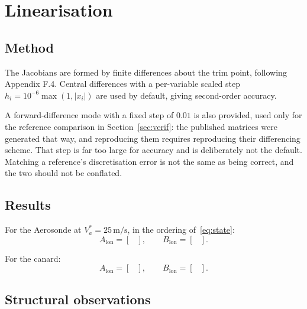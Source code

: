 \documentclass[11pt,a4paper]{article}
\newcommand{\lon}{\mathrm{lon}}
\begin{document}
\section{Linearisation}\label{sec:lin}

\subsection{Method}

The Jacobians are formed by finite differences about the trim point, following
Appendix F.4. Central differences with a per-variable scaled step
$h_i = 10^{-6}\max(1,|x_i|)$ are used by default, giving second-order accuracy.

A forward-difference mode with a fixed step of $0.01$ is also provided, used
only for the reference comparison in Section~\ref{sec:verif}: the published
matrices were generated that way, and reproducing them requires reproducing their
differencing scheme. That step is far too large for accuracy and is deliberately
not the default. Matching a reference's discretisation error is not the same as
being correct, and the two should not be conflated.

\subsection{Results}

For the Aerosonde at $V_a^*=25\,\mathrm{m/s}$, in the ordering
of~\eqref{eq:state}:
\begin{equation}
  A_\lon = \begin{bmatrix}
    
  \end{bmatrix},
  \qquad
  B_\lon = \begin{bmatrix}
    
  \end{bmatrix}.
  \label{eq:Aaero}
\end{equation}

For the canard:
\begin{equation}
  A_\lon = \begin{bmatrix}
    
  \end{bmatrix},
  \qquad
  B_\lon = \begin{bmatrix}
    
  \end{bmatrix}.
  \label{eq:Acanard}
\end{equation}

\subsection{Structural observations}
\end{document}
